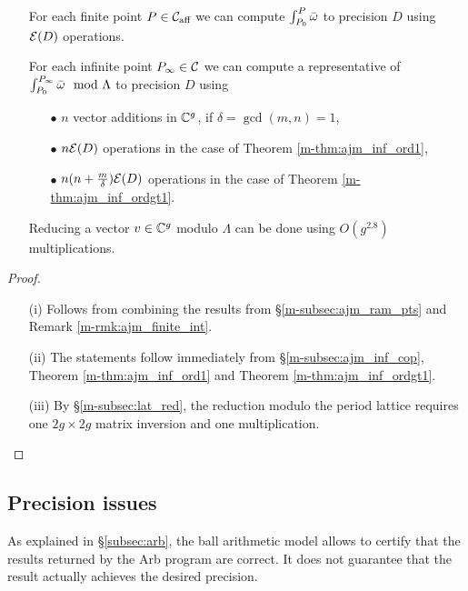 \documentclass[main.tex]{subfiles}
\begin{document}
   \begin{thm} \
   \begin{itemize}
     \item[{\upshape{(i)}}] For each finite point $P \in \mathcal{C}_{\text{aff}}$ we can compute $\int_{P_0}^P \bar{\omega}$ to precision $D$ using
      $\mathcal E(D)$ operations.
     \item[{\upshape{(ii)}}] For each infinite point $P_{\infty} \in \mathcal{C}$ we can compute a representative of $\int_{P_0}^{P_{\infty}} \bar{\omega} \mod \Lambda$ to precision $D$ using
      \begin{itemize}
       \item[$\bullet$] $n$ vector additions in $\mathbb{C}^g$, if $\delta = \gcd(m,n) = 1$,
       \item[$\bullet$] $n \mathcal E(D)$ operations in the case of Theorem \ref{m-thm:ajm_inf_ord1},
       \item[$\bullet$] $n(n+\frac{m}\delta)\mathcal E(D)$ operations  in the case of Theorem \ref{m-thm:ajm_inf_ordgt1}.
      \end{itemize}
      \item[{\upshape{(iii)}}] Reducing a vector $v \in \mathbb{C}^g$ modulo $\Lambda$ can be done using $O(g^{2.8})$ multiplications.
    \end{itemize}
  \end{thm}
   \begin{proof}
    \begin{itemize}
     \item[(i)] Follows from combining the results from \S \ref{m-subsec:ajm_ram_pts} and Remark \ref{m-rmk:ajm_finite_int}.
     \item[(ii)] The statements follow immediately from \S \ref{m-subsec:ajm_inf_cop}, Theorem \ref{m-thm:ajm_inf_ord1} and Theorem \ref{m-thm:ajm_inf_ordgt1}.
     \item[(iii)] By \S \ref{m-subsec:lat_red}, the reduction modulo the period lattice requires one $2g \times 2g$ matrix inversion and one multiplication.
    \end{itemize}
   \end{proof}

   \subsection{Precision issues}

   As explained in \S \ref{subsec:arb}, the ball arithmetic model allows
   to certify that the results returned by the Arb program \cite{Johansson2013arb} are correct.
   It does not guarantee that the result actually achieves the desired
   precision.
\end{document}
